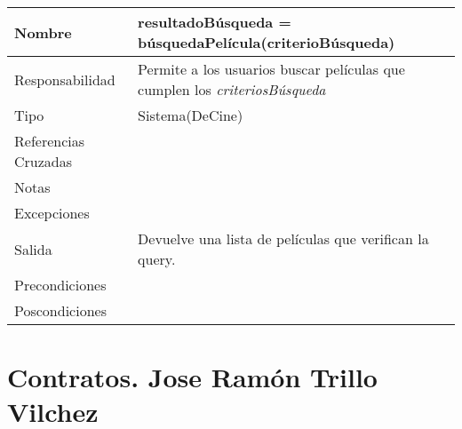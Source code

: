 \documentclass{article}
\begin{document}
\begin{table}[h]
\begin{tabular}{|l|l|l|l|l|l|}
\hline
\multicolumn{2}{|p{3cm}|}{Nombre} & \multicolumn{4}{p{10cm}|}{\textbf{resultadoBúsqueda = búsquedaPelícula(criterioBúsqueda)}}\\
\hline
\multicolumn{2}{|p{3cm}|}{Responsabilidad} & \multicolumn{4}{p{10cm}|}{Permite a los usuarios buscar películas que cumplen los \textit{criteriosBúsqueda}} \\
\hline
\multicolumn{2}{|p{3cm}|}{Tipo} & \multicolumn{4}{p{10cm}|}{Sistema(DeCine)} \\
\hline
\multicolumn{2}{|p{3cm}|}{Referencias Cruzadas} & \multicolumn{4}{p{10cm}|}{} \\
\hline
\multicolumn{2}{|p{3cm}|}{Notas} & \multicolumn{4}{p{10cm}|}{} \\
\hline
\multicolumn{2}{|p{3cm}|}{Excepciones} & \multicolumn{4}{p{10cm}|}{} \\
\hline
\multicolumn{2}{|p{3cm}|}{Salida} & \multicolumn{4}{p{10cm}|}{Devuelve una lista de películas que verifican la query.} \\
\hline
\multicolumn{2}{|p{3cm}|}{Precondiciones} & \multicolumn{4}{p{10cm}|}{} \\
\hline
\multicolumn{2}{|p{3cm}|}{Poscondiciones} & \multicolumn{4}{p{10cm}|}{} \\
\hline
\end{tabular}
\end{table}




\clearpage
\pagebreak
\section{Contratos. Jose Ramón Trillo Vilchez}
\end{document}
